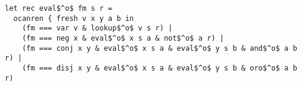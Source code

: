 \begin{lstlisting}
let rec eval$^o$ fm s r =
  ocanren { fresh v x y a b in
    (fm === var v & lookup$^o$ v s r) |
    (fm === neg x & eval$^o$ x s a & not$^o$ a r) |
    (fm === conj x y & eval$^o$ x s a & eval$^o$ y s b & and$^o$ a b r) |
    (fm === disj x y & eval$^o$ x s a & eval$^o$ y s b & oro$^o$ a b r)
  \end{lstlisting}